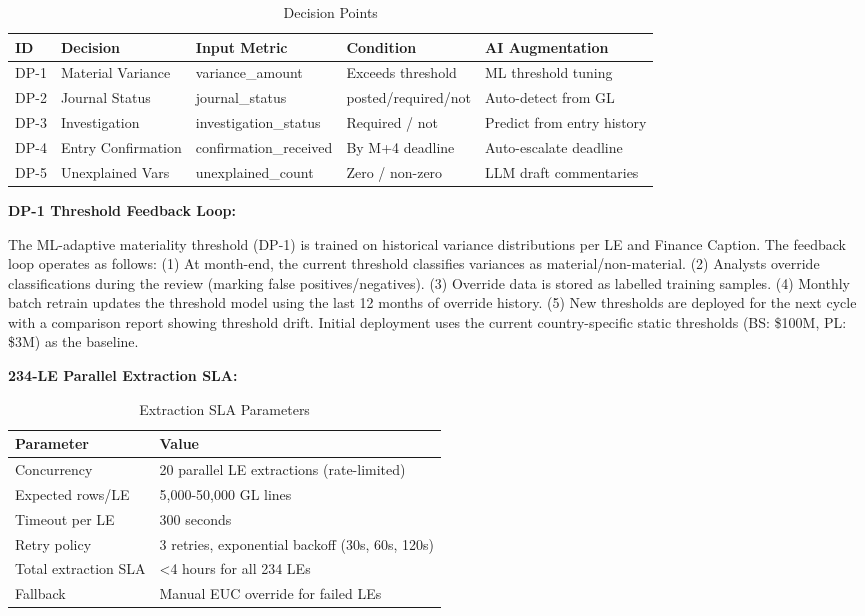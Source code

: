 \documentclass[11pt,a4paper]{article}
\begin{document}
\begin{table}[h]
\centering
\caption{Decision Points}
\begin{tabular}{@{}C{1cm}L{2.5cm}L{3cm}L{3cm}L{4cm}@{}}
\toprule
\textbf{ID} & \textbf{Decision} & \textbf{Input Metric} & \textbf{Condition} & \textbf{AI Augmentation} \\
\midrule
DP-1 & Material Variance & variance\_amount & Exceeds threshold & ML threshold tuning \\
DP-2 & Journal Status & journal\_status & posted/required/not & Auto-detect from GL \\
DP-3 & Investigation & investigation\_status & Required / not & Predict from entry history \\
DP-4 & Entry Confirmation & confirmation\_received & By M+4 deadline & Auto-escalate deadline \\
DP-5 & Unexplained Vars & unexplained\_count & Zero / non-zero & LLM draft commentaries \\
\bottomrule
\end{tabular}
\end{table}

\textbf{DP-1 Threshold Feedback Loop:}

The ML-adaptive materiality threshold (DP-1) is trained on historical variance distributions 
per LE and Finance Caption. The feedback loop operates as follows: (1) At month-end, the current 
threshold classifies variances as material/non-material. (2) Analysts override classifications 
during the review (marking false positives/negatives). (3) Override data is stored as labelled 
training samples. (4) Monthly batch retrain updates the threshold model using the last 12 months 
of override history. (5) New thresholds are deployed for the next cycle with a comparison report 
showing threshold drift. Initial deployment uses the current country-specific static thresholds 
(BS: \$100M, PL: \$3M) as the baseline.

\textbf{234-LE Parallel Extraction SLA:}

\begin{table}[h]
\centering
\caption{Extraction SLA Parameters}
\begin{tabular}{@{}L{4cm}L{10cm}@{}}
\toprule
\textbf{Parameter} & \textbf{Value} \\
\midrule
Concurrency & 20 parallel LE extractions (rate-limited) \\
Expected rows/LE & 5,000-50,000 GL lines \\
Timeout per LE & 300 seconds \\
Retry policy & 3 retries, exponential backoff (30s, 60s, 120s) \\
Total extraction SLA & <4 hours for all 234 LEs \\
Fallback & Manual EUC override for failed LEs \\
\bottomrule
\end{tabular}
\end{table}
\end{document}

